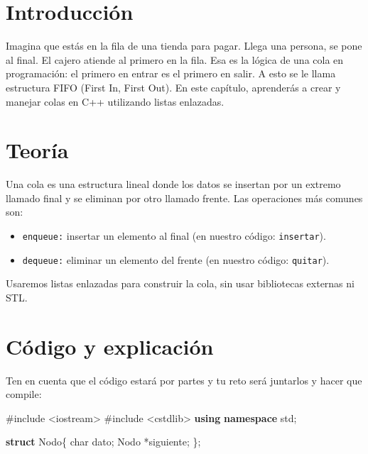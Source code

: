 \documentclass[
  11pt,
  a4paper,
  DIV=11,
  numbers=noendperiod]{scrreprt}
\newenvironment{Shaded}{\begin{snugshade}}{\end{snugshade}}
\newcommand{\DataTypeTok}[1]{\textcolor[rgb]{0.68,0.00,0.00}{#1}}
\newcommand{\ImportTok}[1]{\textcolor[rgb]{0.00,0.46,0.62}{#1}}
\newcommand{\KeywordTok}[1]{\textcolor[rgb]{0.00,0.23,0.31}{\textbf{#1}}}
\newcommand{\NormalTok}[1]{\textcolor[rgb]{0.00,0.23,0.31}{#1}}
\newcommand{\OperatorTok}[1]{\textcolor[rgb]{0.37,0.37,0.37}{#1}}
\newcommand{\PreprocessorTok}[1]{\textcolor[rgb]{0.68,0.00,0.00}{#1}}
\begin{document}
\section{Introducción}\label{introducciuxf3n-2}

Imagina que estás en la fila de una tienda para pagar. Llega una
persona, se pone al final. El cajero atiende al primero en la fila. Esa
es la lógica de una cola en programación: el primero en entrar es el
primero en salir. A esto se le llama estructura FIFO (First In, First
Out). En este capítulo, aprenderás a crear y manejar colas en C++
utilizando listas enlazadas.

\section{Teoría}\label{teoruxeda-1}

Una cola es una estructura lineal donde los datos se insertan por un
extremo llamado final y se eliminan por otro llamado frente. Las
operaciones más comunes son:

\begin{itemize}
\item
  \texttt{enqueue:} insertar un elemento al final (en nuestro código:
  \texttt{insertar}).
\item
  \texttt{dequeue:} eliminar un elemento del frente (en nuestro código:
  \texttt{quitar}).
\end{itemize}

Usaremos listas enlazadas para construir la cola, sin usar bibliotecas
externas ni STL.

\section{Código y explicación}\label{cuxf3digo-y-explicaciuxf3n-1}

Ten en cuenta que el código estará por partes y tu reto será juntarlos y
hacer que compile:

\begin{Shaded}
\begin{Highlighting}[]
\PreprocessorTok{\#include }\ImportTok{\textless{}iostream\textgreater{}}
\PreprocessorTok{\#include }\ImportTok{\textless{}cstdlib\textgreater{}}
\KeywordTok{using} \KeywordTok{namespace}\NormalTok{ std}\OperatorTok{;}

\KeywordTok{struct}\NormalTok{ Nodo}\OperatorTok{\{}
    \DataTypeTok{char}\NormalTok{ dato}\OperatorTok{;}
\NormalTok{    Nodo }\OperatorTok{*}\NormalTok{siguiente}\OperatorTok{;}
\OperatorTok{\};}
\end{Highlighting}
\end{Shaded}
\end{document}
